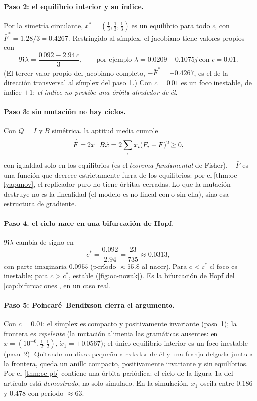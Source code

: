 \paragraph{Paso 2: el equilibrio interior y su índice.} Por la simetría circulante, $x^*=(\tfrac13,\tfrac13,\tfrac13)$ es un equilibrio para todo $c$, con $\bar F^*=1.28/3=0.4267$. Restringido al símplex, el jacobiano tiene valores propios con
\[
  \Re\lambda=\frac{0.092-2.94\,c}{3},\qquad\text{por ejemplo }\lambda=0.0209\pm0.1075j\ \text{con }c=0.01 .
\]
(El tercer valor propio del jacobiano completo, $-\bar F^*=-0.4267$, es el de la dirección transversal al símplex del paso~1.) Con $c=0.01$ es un foco inestable, de índice $+1$: \emph{el índice no prohíbe una órbita alrededor de él}.

\paragraph{Paso 3: sin mutación no hay ciclos.} Con $Q=I$ y $B$ simétrica, la aptitud media cumple
\[
  \dot{\bar F}=2x^{\top} B\dot x=2\sum_ix_i(F_i-\bar F)^2\ge0,
\]
con igualdad solo en los equilibrios (es el \emph{teorema fundamental} de Fisher). $-\bar F$ es una función que decrece estrictamente fuera de los equilibrios: por el \cref{thm:oc-lyapunov}, el replicador puro no tiene órbitas cerradas. Lo que la mutación destruye no es la linealidad (el modelo es no lineal con o sin ella), sino esa estructura de gradiente.

\paragraph{Paso 4: el ciclo nace en una bifurcación de Hopf.} $\Re\lambda$ cambia de signo en
\[
  c^*=\frac{0.092}{2.94}=\frac{23}{735}\approx0.0313,
\]
con parte imaginaria $0.0955$ (período $\approx65.8$ al nacer). Para $c<c^*$ el foco es inestable; para $c>c^*$, estable (\cref{fig:oc-nowak}). Es la bifurcación de Hopf del \cref{cap:bifurcaciones}, en un caso real.

\paragraph{Paso 5: Poincaré--Bendixson cierra el argumento.} Con $c=0.01$: el símplex es compacto y positivamente invariante (paso~1); la frontera es \emph{repelente} (la mutación alimenta las gramáticas ausentes: en $x=(10^{-6},\tfrac12,\tfrac12)$, $\dot x_1=+0.0567$); el único equilibrio interior es un foco inestable (paso~2). Quitando un disco pequeño alrededor de él y una franja delgada junto a la frontera, queda un anillo compacto, positivamente invariante y sin equilibrios. Por el \cref{thm:oc-pb} contiene una órbita periódica: el ciclo de la figura~1a del artículo está \emph{demostrado}, no solo simulado. En la simulación, $x_1$ oscila entre $0.186$ y $0.478$ con período $\approx63$.

